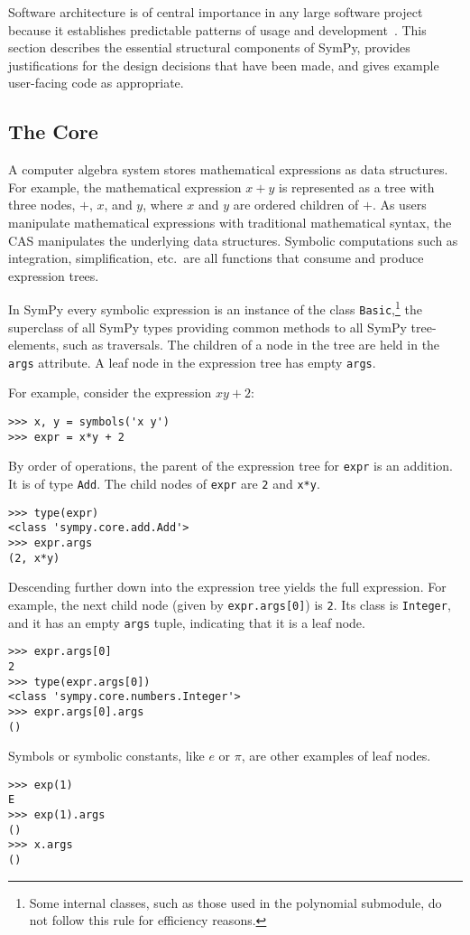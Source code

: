 Software architecture is of central importance in any large software
project because it establishes predictable patterns of usage and
development~\cite{Shaw1996}. This section describes the essential
structural components of SymPy, provides justifications for the design
decisions that have been made, and gives example
user-facing code as appropriate.

\subsection{The Core}
\label{sec:core}
A computer algebra system stores mathematical expressions as data structures.
For example, the mathematical expression $x + y$ is represented as a tree with
three nodes, $+$, $x$, and $y$, where $x$ and $y$ are ordered children of $+$.
As users manipulate mathematical expressions with traditional mathematical
syntax, the CAS manipulates the underlying data structures. Symbolic
computations such as integration, simplification, etc.\ are all functions that
consume and produce expression trees.

In SymPy every symbolic expression is an instance of the class
\texttt{Basic},\footnote{Some internal classes, such as those used in the
  polynomial submodule, do not follow this rule for efficiency reasons.} the
superclass of all SymPy types providing common methods to all SymPy
tree-elements, such as traversals. The children of a node in the tree are held
in the \texttt{args} attribute. A leaf node in the expression tree
has empty \texttt{args}.

For example, consider the expression $xy + 2$:
\begin{verbatim}
>>> x, y = symbols('x y')
>>> expr = x*y + 2
\end{verbatim}
By order of operations, the parent of the expression tree for \texttt{expr} is
an addition. It is of type \texttt{Add}. The child nodes of \texttt{expr} are
\texttt{2} and \texttt{x*y}.
\begin{verbatim}
>>> type(expr)
<class 'sympy.core.add.Add'>
>>> expr.args
(2, x*y)
\end{verbatim}

Descending further down into the expression tree yields the full expression. For
example, the next child node (given by \texttt{expr.args[0]}) is
\texttt{2}. Its class is \texttt{Integer}, and it has an empty \texttt{args}
tuple, indicating that it is a leaf node.
\begin{verbatim}
>>> expr.args[0]
2
>>> type(expr.args[0])
<class 'sympy.core.numbers.Integer'>
>>> expr.args[0].args
()
\end{verbatim}
Symbols or symbolic constants, like $e$ or $\pi$, are other examples of
leaf nodes.
\begin{verbatim}
>>> exp(1)
E
>>> exp(1).args
()
>>> x.args
()
\end{verbatim}

